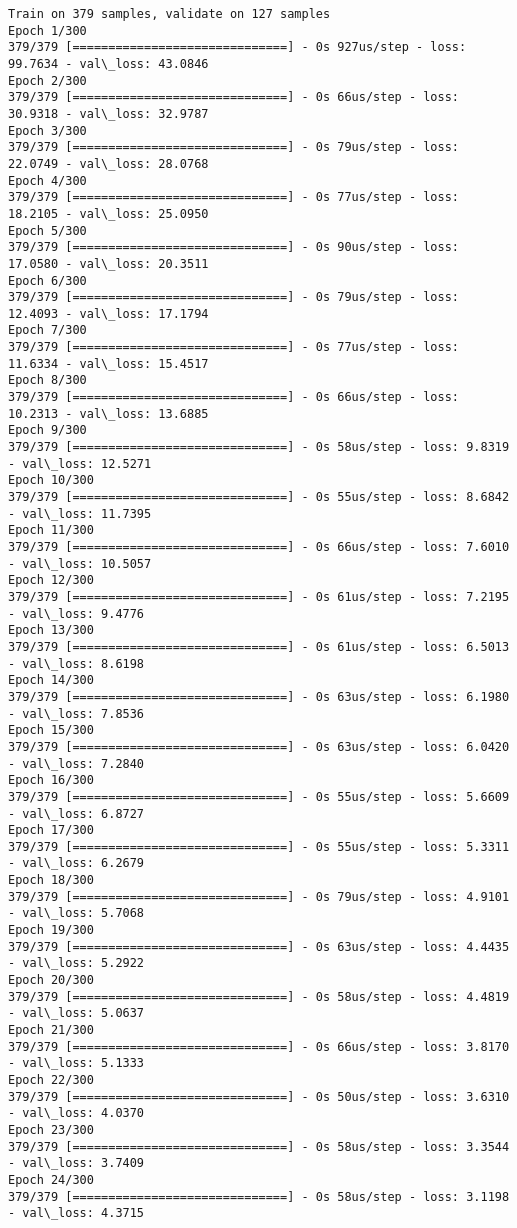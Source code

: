 \documentclass[11pt]{article}
\begin{document}
    \begin{Verbatim}[commandchars=\\\{\}]
Train on 379 samples, validate on 127 samples
Epoch 1/300
379/379 [==============================] - 0s 927us/step - loss: 99.7634 - val\_loss: 43.0846
Epoch 2/300
379/379 [==============================] - 0s 66us/step - loss: 30.9318 - val\_loss: 32.9787
Epoch 3/300
379/379 [==============================] - 0s 79us/step - loss: 22.0749 - val\_loss: 28.0768
Epoch 4/300
379/379 [==============================] - 0s 77us/step - loss: 18.2105 - val\_loss: 25.0950
Epoch 5/300
379/379 [==============================] - 0s 90us/step - loss: 17.0580 - val\_loss: 20.3511
Epoch 6/300
379/379 [==============================] - 0s 79us/step - loss: 12.4093 - val\_loss: 17.1794
Epoch 7/300
379/379 [==============================] - 0s 77us/step - loss: 11.6334 - val\_loss: 15.4517
Epoch 8/300
379/379 [==============================] - 0s 66us/step - loss: 10.2313 - val\_loss: 13.6885
Epoch 9/300
379/379 [==============================] - 0s 58us/step - loss: 9.8319 - val\_loss: 12.5271
Epoch 10/300
379/379 [==============================] - 0s 55us/step - loss: 8.6842 - val\_loss: 11.7395
Epoch 11/300
379/379 [==============================] - 0s 66us/step - loss: 7.6010 - val\_loss: 10.5057
Epoch 12/300
379/379 [==============================] - 0s 61us/step - loss: 7.2195 - val\_loss: 9.4776
Epoch 13/300
379/379 [==============================] - 0s 61us/step - loss: 6.5013 - val\_loss: 8.6198
Epoch 14/300
379/379 [==============================] - 0s 63us/step - loss: 6.1980 - val\_loss: 7.8536
Epoch 15/300
379/379 [==============================] - 0s 63us/step - loss: 6.0420 - val\_loss: 7.2840
Epoch 16/300
379/379 [==============================] - 0s 55us/step - loss: 5.6609 - val\_loss: 6.8727
Epoch 17/300
379/379 [==============================] - 0s 55us/step - loss: 5.3311 - val\_loss: 6.2679
Epoch 18/300
379/379 [==============================] - 0s 79us/step - loss: 4.9101 - val\_loss: 5.7068
Epoch 19/300
379/379 [==============================] - 0s 63us/step - loss: 4.4435 - val\_loss: 5.2922
Epoch 20/300
379/379 [==============================] - 0s 58us/step - loss: 4.4819 - val\_loss: 5.0637
Epoch 21/300
379/379 [==============================] - 0s 66us/step - loss: 3.8170 - val\_loss: 5.1333
Epoch 22/300
379/379 [==============================] - 0s 50us/step - loss: 3.6310 - val\_loss: 4.0370
Epoch 23/300
379/379 [==============================] - 0s 58us/step - loss: 3.3544 - val\_loss: 3.7409
Epoch 24/300
379/379 [==============================] - 0s 58us/step - loss: 3.1198 - val\_loss: 4.3715

\end{Verbatim}
\end{document}
